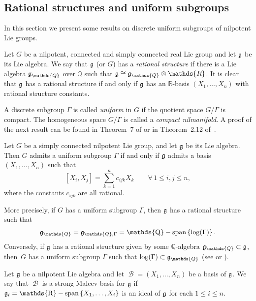 \documentclass[pdftex]{sigma}
\newcommand{\set}[1]{\left\{#1\right\}}
\DeclareMathOperator{\spann}{\mathds{R}-span}
\DeclareMathOperator{\spannq}{\mathds{Q}-span}
\DeclareMathOperator{\bbase}{\mathscr{B}}
\begin{document}
\subsection{Rational structures and uniform subgroups}\label{section2.3}

 In this section we present some results on discrete uniform
subgroups of nilpotent Lie groups.


 Let $G$ be a nilpotent, connected
and simply connected real Lie group and let $\frak g$ be its Lie
algebra. We say that $\frak g$ (or $G$) has a \textit{rational
structure} if there is a Lie algebra $\frak g_\mathds{Q}$ over
$\mathds{Q}$ such that $\frak g \cong \frak g_\mathds{Q} \otimes
\mathds{R}$. It is clear that $\frak g$ has a rational structure if
and only if $\frak g$ has an $ \mathds{R}$-basis $(X_1,\dots,X_n)$
with rational structure constants.

 A discrete subgroup $\Gamma$ is
called \textit{uniform} in $G$ if the quotient space $G/\Gamma$ is
compact. The homogeneous space $G/\Gamma$ is called a
\textit{compact nilmanifold}. A proof of the next result can be
found in Theorem~7 of \cite{Malcev1} or in Theorem~2.12 of~\cite{Raghunathan}.


\begin{theorem} \label{Malcev-cri}
Let $G$ be a simply connected nilpotent Lie
group, and let $\frak g$ be its Lie algebra. Then $G$ admits a
uniform subgroup $\Gamma$ if and only if $\frak g$ admits a basis
$(X_1,\dotsc,X_n)$ such that
\[
[X_i, X_j] =  \sum_{k=1}^n c_{ijk} X_k\qquad \forall\,  1\leq i, j\leq n,
\]
 where the constants $c_{ijk}$ are all
rational.
\end{theorem}



More precisely, if $G$ has a uniform subgroup $\Gamma$, then $\frak
g$  has a rational structure such that
\[
\frak g_\mathds{Q}= \frak g_{\mathds{Q}, \Gamma}= \spannq\set{\log(\Gamma)}.
\]
 Conversely, if
$\frak g$ has a rational structure given by some
$\mathds{Q}$-algebra $\frak g_\mathds{Q}\subset \frak g$, then~$G$
has a uniform subgroup $\Gamma$ such that $\log(\Gamma) \subset
\frak g_\mathds{Q}$ (see \cite{Cor1} or \cite{Malcev1}).





\begin{definition} Let $\frak g$ be a nilpotent Lie algebra and let
$\bbase=(X_1, \ldots, X_n)$ be a basis of $\frak g$.
 We say that $\bbase$ is a  strong  Malcev
basis for $\frak g$ if  $\frak g_i=\spann\set{X_1, \ldots, X_i}$ is
 an ideal of $\frak g$ for each $1\leq i\leq n$.
\end{definition}
\end{document}
